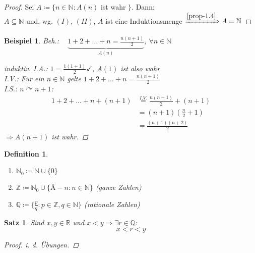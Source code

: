 \documentclass[titlepage,ngerman,a4paper,headsepline,DIV15,halfparskip*,14pt]{scrartcl}
\newcommand{\Z}{\mathbb{Z}}
\newcommand{\R}{\mathbb{R}}
\newcommand{\N}{\mathbb{N}}
\newcommand{\Q}{\mathbb{Q}}
\theoremstyle{dotless}
\newtheorem{satz}{Satz}[section]
\newtheorem*{definition}{Definition}
\newtheorem*{beispiel*}{Beispiel}
\begin{document}
\begin{proof}
	Sei $A \coloneqq \{ n \in \N : A(n)$ ist wahr $\}$. Dann: \\
	$A \subseteq \N$ und, wg. $(I)$, $(II)$, $A$ ist eine Induktionsmenge $\xRightarrow[]{\ref{prop-1.4}
	} A = \N$
\end{proof}


\begin{beispiel*}
	Beh.: ~ $\underbrace{1 + 2 + \dotsc + n = \frac{n (n + 1)}{2}}_{A(n)}, ~\forall n \in \N$
	
	\begin{proof}[induktiv]
		I.A.: $1 = \frac{1 (1 + 1)}{2} \checkmark$, $A(1)$ ist also wahr. \\
		I.V.: Für ein $n \in \N$ gelte $1 + 2 + \dotsc + n = \frac{n (n + 1)}{2}$ \\
		I.S.: $n \curvearrowright n + 1$: 
		\begin{align*}
			1 + 2 + \dotsc + n + (n + 1) & \overset{I.V.}{=}  \frac{n (n + 1)}{2} + (n + 1) \\
									 	 & = (n + 1) \left( \frac{n}{2} + 1 \right) \\
									 	 & = \frac{(n + 1)(n + 2)}{2}
		\end{align*}
		$\Rightarrow A(n + 1)$ ist wahr.
	\end{proof}
\end{beispiel*}

 
\begin{definition} ~\
	\begin{enumerate}
		\item $\N_{0} \coloneqq \N \cup \{ 0 \}$
		\item $\Z \coloneqq \N_{0} \cup \{Â - n : n \in \N \}$ (ganze Zahlen)
		\item $\Q \coloneqq \{ \frac{p}{q} : p \in \Z, q \in \N \}$ (rationale Zahlen)
	\end{enumerate}
\end{definition}


\begin{satz} \label{satz:1.5}
	Sind $x, y \in \R$ und $x < y \Rightarrow \exists r \in \Q$:
	$$ x < r < y $$	

	\begin{proof}
		i. d. Übungen.
	\end{proof}
\end{satz}

   
\end{document}
